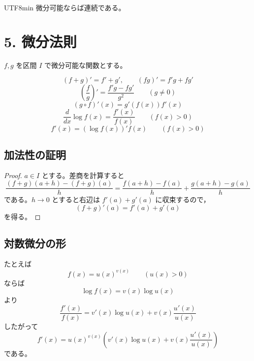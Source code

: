 \documentclass[a4paper,12pt]{article}
\begin{document}
\begin{CJK}{UTF8}{min}
微分可能ならば連続である。

\section*{5. 微分法則}

$f,g$ を区間 $I$ で微分可能な関数とする。

\begin{theorem}
\[
(f+g)'=f'+g',\qquad (fg)'=f'g+fg'
\]
\[
\left(\frac{f}{g}\right)'=\frac{f'g-fg'}{g^2}\qquad (g\ne 0)
\]
\[
(g\circ f)'(x)=g'(f(x))f'(x)
\]
\[
\frac{d}{dx}\log f(x)=\frac{f'(x)}{f(x)}\qquad (f(x)>0)
\]
\[
f'(x)=(\log f(x))'f(x)\qquad (f(x)>0)
\]
\end{theorem}

\subsection*{加法性の証明}

\begin{proof}
$a\in I$ とする。差商を計算すると
\[
\frac{(f+g)(a+h)-(f+g)(a)}{h}
=\frac{f(a+h)-f(a)}{h}+\frac{g(a+h)-g(a)}{h}
\]
である。$h\to 0$ とすると右辺は $f'(a)+g'(a)$ に収束するので，
\[
(f+g)'(a)=f'(a)+g'(a)
\]
を得る。
\end{proof}

\subsection*{対数微分の形}

たとえば
\[
f(x)=u(x)^{v(x)} \qquad (u(x)>0)
\]
ならば
\[
\log f(x)=v(x)\log u(x)
\]
より
\[
\frac{f'(x)}{f(x)}=v'(x)\log u(x)+v(x)\frac{u'(x)}{u(x)}
\]
したがって
\[
f'(x)=u(x)^{v(x)}\left(v'(x)\log u(x)+v(x)\frac{u'(x)}{u(x)}\right)
\]
である。

\ifPDFTeX
\end{CJK}
\fi
\end{document}
